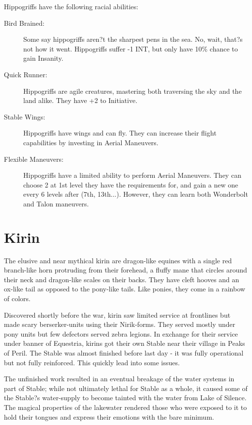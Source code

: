 \documentclass[11pt,a4paper,twocolumn]{book}
\begin{document}
	Hippogriffs have the following racial abilities:
	\begin{description}
		\item[Bird Brained:] Some say hippogriffs aren?t the sharpest pens in the sea. No, wait, that?s not how it went. Hippogriffs suffer -1 INT, but only have 10\% chance to gain Insanity.
		\item[Quick Runner:] Hippogriffs are agile creatures, mastering both traversing the sky and the land alike. They have +2 to Initiative.
		\item[Stable Wings:] Hippogriffs have wings and can fly. They can increase their flight capabilities by investing in Aerial Maneuvers.
		\item[Flexible Maneuvers:] Hippogriffs have a limited ability to perform Aerial Maneuvers. They can choose 2 at 1st level they have the requirements for, and gain a new one every 6 levels after (7th, 13th...). However, they can learn both Wonderbolt and Talon maneuvers.
	\end{description}

	\clearpage
	
	\section*{Kirin}
	
	The elusive and near mythical kirin are dragon-like equines with a single red branch-like horn protruding from their forehead, a fluffy mane that circles around their neck and dragon-like scales on their backs. They have cleft hooves and an ox-like tail as opposed to the pony-like tails. Like ponies, they come in a rainbow of colors.
	
	Discovered shortly before the war, kirin saw limited service at frontlines but made scary berserker-units using their Nirik-forms. They served mostly under pony units but few defectors served zebra legions. In exchange for their service under banner of Equestria, kirins got their own Stable near their village in Peaks of Peril. The Stable was almost finished before last day - it was fully operational but not fully reinforced. This quickly lead into some issues.
	
	The unfinished work resulted in an eventual breakage of the water systems in part of Stable; while not ultimately lethal for Stable as a whole, it caused some of the Stable?s water-supply to become tainted with the water from Lake of Silence. The magical properties of the lakewater rendered those who were exposed to it to hold their tongues and express their emotions with the bare minimum. 
	
\end{document}
